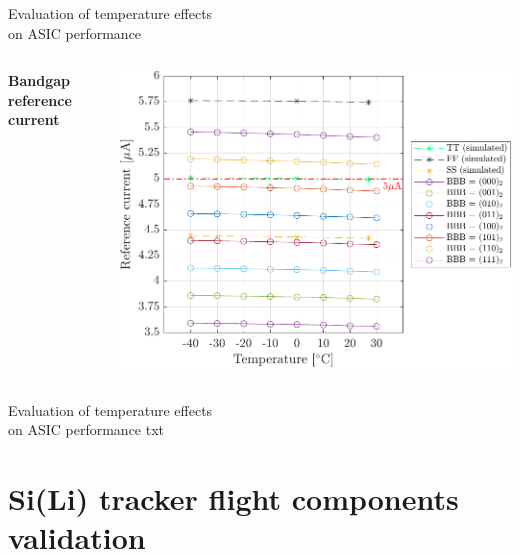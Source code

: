 \documentclass[aspectratio=169,xcolor=dvipsnames]{beamer}
\begin{document}
\begin{frame}{\vspace{-0.3cm}Evaluation of temperature effects \\on ASIC performance}
\begin{columns}[T]
    \vskip0.2cm
    \textbf{Bandgap reference current}\\
    \vskip0.15cm

    
    \begin{center}
        \includegraphics[height=0.55\textheight]{images/temperature_effects/BGR_current_Xtemp_all-BBB.pdf}
    \end{center}
   

    
    \end{columns}
\end{frame}

\begin{frame}{\vspace{-0.3cm}Evaluation of temperature effects \\on ASIC performance}
    txt
\end{frame}


\section{Si(Li) tracker flight components validation}
\end{document}
